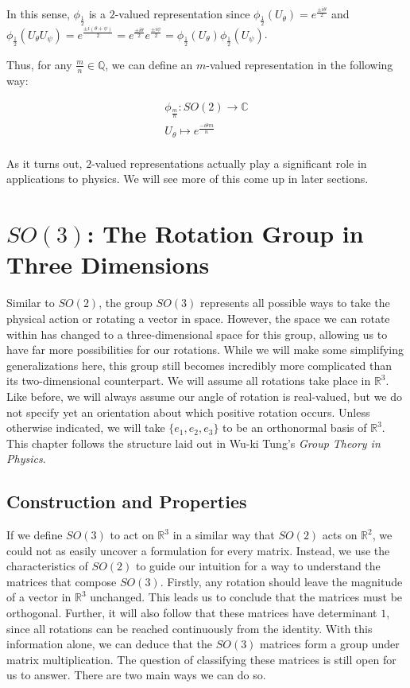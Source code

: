 \documentclass[10pt]{ucthesis}
\newcommand{\R}{\mathbb{R}}
\newcommand{\C}{\mathbb{C}}
\newcommand{\Q}{\mathbb{Q}}
\begin{document}
In this sense, $\phi_{\frac{1}{2}}$ is a $2$-valued representation since $\phi_{\frac{1}{2}}(U_\theta) = e^\frac{\pm i\theta}{2}$ and $\phi_{\frac{1}{2}}(U_\theta U_\psi) =  e^\frac{\pm i(\theta + \psi)}{2} =  e^\frac{\pm i\theta}{2} e^\frac{\pm i\psi}{2} = \phi_{\frac{1}{2}}(U_\theta)\phi_{\frac{1}{2}}(U_\psi)$.

Thus, for any $\frac{m}{n} \in \Q$, we can define an $m$-valued representation in the following way:

$$\begin{aligned}
	\phi_\frac{m}{n}:SO(2)\rightarrow \C \\
	U_\theta \mapsto e^\frac{-i\theta m}{n} \\
\end{aligned}$$

As it turns out, $2$-valued representations actually play a significant role in applications to physics. We will see more of this come up in later sections.

\chapter{$SO(3)$: The Rotation Group in Three Dimensions}

Similar to $SO(2)$, the group $SO(3)$ represents all possible ways to take the physical action or rotating a vector in space. However, the space we can rotate within has changed to a three-dimensional space for this group, allowing us to have far more possibilities for our rotations. While we will make some simplifying generalizations here, this group still becomes incredibly more complicated than its two-dimensional counterpart. We will assume all rotations take place in $\R^3$. Like before, we will always assume our angle of rotation is real-valued, but we do not specify yet an orientation about which positive rotation occurs. Unless otherwise indicated, we will take $\{e_1,e_2,e_3\}$ to be an orthonormal basis of $\R^3$. This chapter follows the structure laid out in Wu-ki Tung's \textit{Group Theory in Physics}. \cite{Tung}

\section{Construction and Properties}

If we define $SO(3)$ to act on $\R^3$ in a similar way that $SO(2)$ acts on $\R^2$, we could not as easily uncover a formulation for every matrix. Instead, we use the characteristics of $SO(2)$ to guide our intuition for a way to understand the matrices that compose $SO(3)$. Firstly, any rotation should leave the magnitude of a vector in $\R^3$ unchanged. This leads us to conclude that the matrices must be orthogonal. Further, it will also follow that these matrices have determinant $1$, since all rotations can be reached continuously from the identity. With this information alone, we can deduce that the $SO(3)$ matrices form a group under matrix multiplication. The question of classifying these matrices is still open for us to answer. There are two main ways we can do so.
\end{document}
